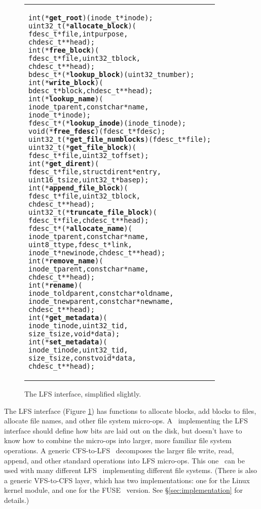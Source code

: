 \begin{figure}[htb]
\vskip-14pt
\begin{tabular}{@{\hskip0.25in}p{2in}@{}}
\begin{scriptsize}
\begin{alltt}
int (*\textbf{get_root})(inode_t *inode);
uint32_t (*\textbf{allocate_block})(
    fdesc_t *file, int purpose,
    chdesc_t **head);
int (*\textbf{free_block})(
    fdesc_t *file, uint32_t block,
    chdesc_t **head);
bdesc_t *(*\textbf{lookup_block})(uint32_t number);
int (*\textbf{write_block})(
    bdesc_t *block, chdesc_t **head);
int (*\textbf{lookup_name})(
    inode_t parent, const char *name,
    inode_t *inode);
fdesc_t *(*\textbf{lookup_inode})(inode_t inode);
void (*\textbf{free_fdesc})(fdesc_t *fdesc);
uint32_t (*\textbf{get_file_numblocks})(fdesc_t *file);
uint32_t (*\textbf{get_file_block})(
    fdesc_t *file, uint32_t offset);
int (*\textbf{get_dirent})(
    fdesc_t *file, struct dirent *entry,
    uint16_t size, uint32_t *basep);
int (*\textbf{append_file_block})(
    fdesc_t *file, uint32_t block,
    chdesc_t **head);
uint32_t (*\textbf{truncate_file_block})(
    fdesc_t *file, chdesc_t **head);
fdesc_t *(*\textbf{allocate_name})(
    inode_t parent, const char *name,
    uint8_t type, fdesc_t *link,
    inode_t *newinode, chdesc_t **head);
int (*\textbf{remove_name})(
    inode_t parent, const char *name,
    chdesc_t **head);
int (*\textbf{rename})(
    inode_t oldparent, const char *oldname,
    inode_t newparent, const char *newname,
    chdesc_t **head);
int (*\textbf{get_metadata})(
    inode_t inode, uint32_t id,
    size_t size, void *data);
int (*\textbf{set_metadata})(
    inode_t inode, uint32_t id,
    size_t size, const void *data,
    chdesc_t **head);
\end{alltt}
\end{scriptsize}
\end{tabular}
\vspace{-10pt}
\caption{\label{fig:lfs} The LFS interface, simplified slightly.}
\end{figure}

The LFS interface (Figure \ref{fig:lfs}) has functions to allocate blocks, add
blocks to files, allocate file names, and other file system micro-ops. A
\module\ implementing the LFS interface should define how bits are laid out on
the disk, but doesn't have to know how to combine the micro-ops into larger,
more familiar file system operations. A generic CFS-to-LFS \module\ decomposes
the larger file write, read, append, and other standard operations into LFS
micro-ops. This one \module\ can be used with many different LFS \modules\
implementing different file systems. (There is also a generic VFS-to-CFS layer,
which has two implementations: one for the Linux kernel module, and one for the
FUSE~\cite{fuse} version. See \S\ref{sec:implementation} for details.)

